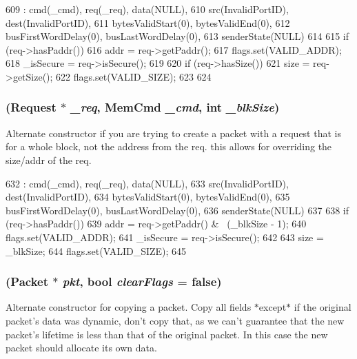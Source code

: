 \begin{DoxyCode}
609         :  cmd(_cmd), req(_req), data(NULL),
610            src(InvalidPortID), dest(InvalidPortID),
611            bytesValidStart(0), bytesValidEnd(0),
612            busFirstWordDelay(0), busLastWordDelay(0),
613            senderState(NULL)
614     {
615         if (req->hasPaddr()) {
616             addr = req->getPaddr();
617             flags.set(VALID_ADDR);
618             _isSecure = req->isSecure();
619         }
620         if (req->hasSize()) {
621             size = req->getSize();
622             flags.set(VALID_SIZE);
623         }
624     }
\end{DoxyCode}
\hypertarget{classPacket_a14ed9efd5f1e1b89778e2dd02cb0d6ab}{
\subsubsection[{Packet}]{ ({\bf Request} $\ast$ {\em \_\-req}, \/  {\bf MemCmd} {\em \_\-cmd}, \/  int {\em \_\-blkSize})}}
\label{classPacket_a14ed9efd5f1e1b89778e2dd02cb0d6ab}
Alternate constructor if you are trying to create a packet with a request that is for a whole block, not the address from the req. this allows for overriding the size/addr of the req. 


\begin{DoxyCode}
632         :  cmd(_cmd), req(_req), data(NULL),
633            src(InvalidPortID), dest(InvalidPortID),
634            bytesValidStart(0), bytesValidEnd(0),
635            busFirstWordDelay(0), busLastWordDelay(0),
636            senderState(NULL)
637     {
638         if (req->hasPaddr()) {
639             addr = req->getPaddr() & ~(_blkSize - 1);
640             flags.set(VALID_ADDR);
641             _isSecure = req->isSecure();
642         }
643         size = _blkSize;
644         flags.set(VALID_SIZE);
645     }
\end{DoxyCode}
\hypertarget{classPacket_a19cdd324c9f9070b3031e8a4521ac4ba}{
\subsubsection[{Packet}]{ ({\bf Packet} $\ast$ {\em pkt}, \/  bool {\em clearFlags} = {\ttfamily false})}}
\label{classPacket_a19cdd324c9f9070b3031e8a4521ac4ba}
Alternate constructor for copying a packet. Copy all fields $\ast$except$\ast$ if the original packet's data was dynamic, don't copy that, as we can't guarantee that the new packet's lifetime is less than that of the original packet. In this case the new packet should allocate its own data. 


